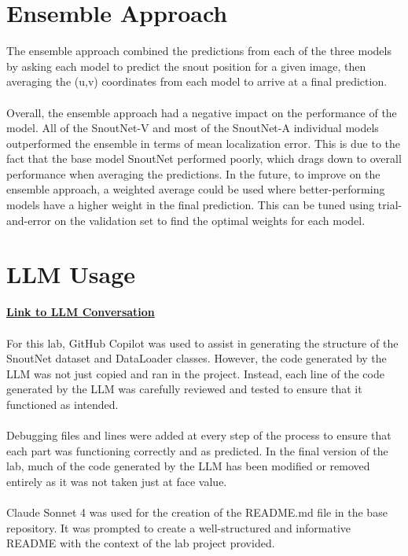 \documentclass[letterpaper,11pt]{article}
\begin{document}
\section{Ensemble Approach}
The ensemble approach combined the predictions from each of the three models by asking each model to predict the snout position for a given image, then averaging the (u,v) coordinates from each model to arrive at a final prediction. \\
\\
Overall, the ensemble approach had a negative impact on the performance of the model. All of the SnoutNet-V and most of the SnoutNet-A individual models outperformed the ensemble in terms of mean localization error. This is due to the fact that the base model SnoutNet performed poorly, which drags down to overall performance when averaging the predictions. In the future, to improve on the ensemble approach, a weighted average could be used where better-performing models have a higher weight in the final prediction. This can be tuned using trial-and-error on the validation set to find the optimal weights for each model.

\section{LLM Usage}
\textcolor{blue}{\textbf{\href{https://github.com/copilot/share/88025032-03a4-8871-b803-a44664ab6910}{Link to LLM Conversation}}}\\
\\
For this lab, GitHub Copilot was used to assist in generating the structure of the SnoutNet dataset and DataLoader classes. However, the code generated by the LLM was not just copied and ran in the project. Instead, each line of the code generated by the LLM was carefully reviewed and tested to ensure that it functioned as intended. \\
\\
Debugging files and lines were added at every step of the process to ensure that each part was functioning correctly and as predicted. In the final version of the lab, much of the code generated by the LLM has been modified or removed entirely as it was not taken just at face value.\\
\\
Claude Sonnet 4 was used for the creation of the README.md file in the base repository. It was prompted to create a well-structured and informative README with the context of the lab project provided.
\end{document}

